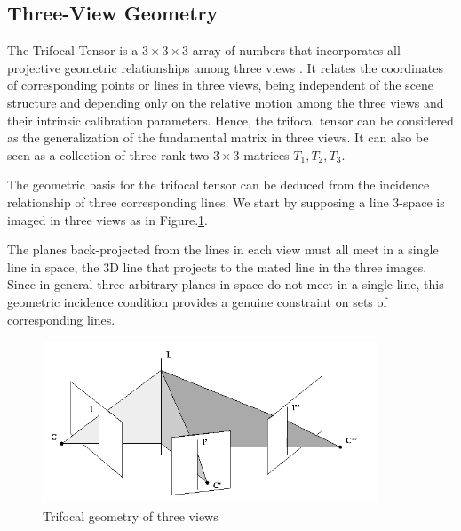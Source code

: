 \subsection{Three-View Geometry}
The Trifocal Tensor is a $3 \times 3 \times 3$ array of numbers that incorporates all projective geometric relationships among three views \cite{Hartley2004}. It relates the coordinates of corresponding points or lines in three views, being independent of the scene structure and depending only on the relative motion among the three views and their intrinsic calibration parameters. Hence, the trifocal tensor can be considered as the generalization of the fundamental matrix in three views. It can also be seen as a collection of three rank-two $3 \times 3$ matrices $T_1, T_2, T_3$.

The geometric basis for the trifocal tensor can be deduced from the incidence relationship of three corresponding lines. We start by supposing a line 3-space is imaged in three views as in Figure.\ref{fig:threeviews}.

The planes back-projected from the lines in each view must all meet in a single line in space, the 3D line that projects to the mated line in the three images. Since in general three arbitrary planes in space do not meet in a single line, this geometric incidence condition provides a genuine constraint on sets of corresponding lines.

\begin{figure}[ht!]
  \centering
  \includegraphics[width=100mm]{figures/threeviews.jpg}
  \caption{Trifocal geometry of three views}
  \label{fig:threeviews}
\end{figure}

